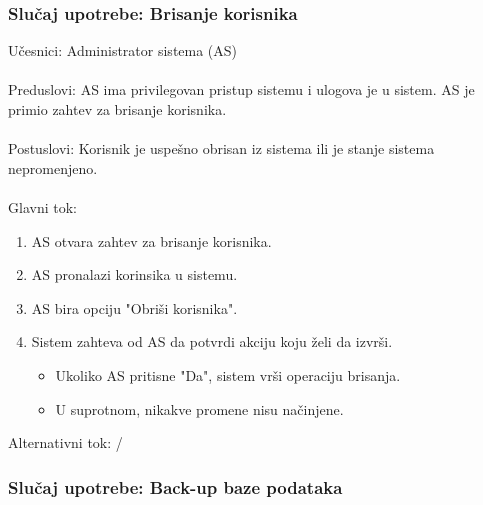 \subsubsection{Slu\v caj upotrebe: Brisanje korisnika}

\noindent U\v cesnici: Administrator sistema (AS)
\\
\\ Preduslovi: AS ima privilegovan pristup sistemu i ulogova je u sistem. AS je primio zahtev za brisanje korisnika.
\\
\\ Postuslovi: Korisnik je uspe\v sno obrisan iz sistema ili je stanje sistema nepromenjeno.
\\
\\ Glavni tok:
\begin{enumerate}
	\item AS otvara zahtev za brisanje korisnika.
	\item AS pronalazi korinsika u sistemu.
	\item AS bira opciju "Obri\v si korisnika".
	\item Sistem zahteva od AS da potvrdi akciju koju \v zeli da izvr\v si.
	\begin{itemize}
		\item Ukoliko AS pritisne "Da", sistem vr\v si operaciju brisanja.
		\item U suprotnom, nikakve promene nisu na\v cinjene.
	\end{itemize}
\end{enumerate}

\noindent Alternativni tok: /

\subsubsection{Slu\v caj upotrebe: Back-up baze podataka}

